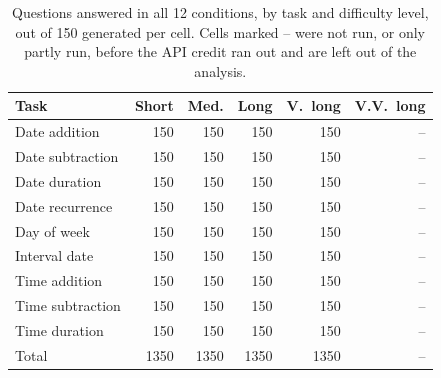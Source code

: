 \begin{table}[t]
\centering
\small
\setlength{\tabcolsep}{3.5pt}
\begin{tabular}{@{}lrrrrr@{}}
\toprule
Task & Short & Med. & Long & V.\ long & V.V.\ long \\
\midrule
Date addition & 150 & 150 & 150 & 150 & -- \\
Date subtraction & 150 & 150 & 150 & 150 & -- \\
Date duration & 150 & 150 & 150 & 150 & -- \\
Date recurrence & 150 & 150 & 150 & 150 & -- \\
Day of week & 150 & 150 & 150 & 150 & -- \\
Interval date & 150 & 150 & 150 & 150 & -- \\
Time addition & 150 & 150 & 150 & 150 & -- \\
Time subtraction & 150 & 150 & 150 & 150 & -- \\
Time duration & 150 & 150 & 150 & 150 & -- \\
\midrule
Total & 1350 & 1350 & 1350 & 1350 & -- \\
\bottomrule
\end{tabular}
\caption{Questions answered in all 12 conditions, by task and difficulty level, out of 150 generated per cell. Cells marked -- were not run, or only partly run, before the API credit ran out and are left out of the analysis.}
\label{tab:coverage}
\end{table}
